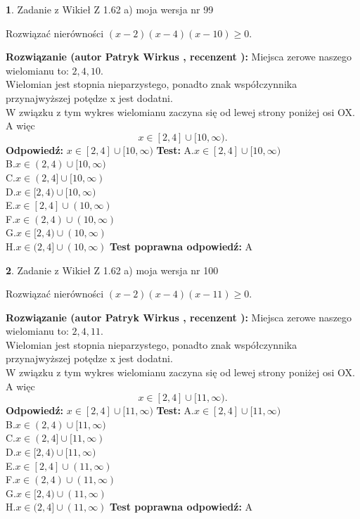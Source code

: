 \documentclass[12pt, a4paper]{article}
\theoremstyle{definition} %
\newtheorem{zad}{}
\newcommand{\zadStart}[1]{\begin{zad}#1\newline}
\newcommand{\zadStop}{\end{zad}}
\newcommand{\rozwStart}[2]{\noindent \textbf{Rozwiązanie (autor #1 , recenzent #2): }\newline}
\newcommand{\rozwStop}{\newline}
\newcommand{\odpStart}{\noindent \textbf{Odpowiedź:}\newline}
\newcommand{\odpStop}{\newline}
\newcommand{\testStart}{\noindent \textbf{Test:}\newline}
\newcommand{\testStop}{\newline}
\newcommand{\kluczStart}{\noindent \textbf{Test poprawna odpowiedź:}\newline}
\newcommand{\kluczStop}{\newline}
\begin{document}
\zadStart{Zadanie z Wikieł Z 1.62 a) moja wersja nr 99}

Rozwiązać nierówności $(x-2)(x-4)(x-10)\ge0$.
\zadStop
\rozwStart{Patryk Wirkus}{}
Miejsca zerowe naszego wielomianu to: $2, 4, 10$.\\
Wielomian jest stopnia nieparzystego, ponadto znak współczynnika przy\linebreak najwyższej potędze x jest dodatni.\\ W związku z tym wykres wielomianu zaczyna się od lewej strony poniżej osi OX. A więc $$x \in [2,4] \cup [10,\infty).$$
\rozwStop
\odpStart
$x \in [2,4] \cup [10,\infty)$
\odpStop
\testStart
A.$x \in [2,4] \cup [10,\infty)$\\
B.$x \in (2,4) \cup [10,\infty)$\\
C.$x \in (2,4] \cup [10,\infty)$\\
D.$x \in [2,4) \cup [10,\infty)$\\
E.$x \in [2,4] \cup (10,\infty)$\\
F.$x \in (2,4) \cup (10,\infty)$\\
G.$x \in [2,4) \cup (10,\infty)$\\
H.$x \in (2,4] \cup (10,\infty)$
\testStop
\kluczStart
A
\kluczStop



\zadStart{Zadanie z Wikieł Z 1.62 a) moja wersja nr 100}

Rozwiązać nierówności $(x-2)(x-4)(x-11)\ge0$.
\zadStop
\rozwStart{Patryk Wirkus}{}
Miejsca zerowe naszego wielomianu to: $2, 4, 11$.\\
Wielomian jest stopnia nieparzystego, ponadto znak współczynnika przy\linebreak najwyższej potędze x jest dodatni.\\ W związku z tym wykres wielomianu zaczyna się od lewej strony poniżej osi OX. A więc $$x \in [2,4] \cup [11,\infty).$$
\rozwStop
\odpStart
$x \in [2,4] \cup [11,\infty)$
\odpStop
\testStart
A.$x \in [2,4] \cup [11,\infty)$\\
B.$x \in (2,4) \cup [11,\infty)$\\
C.$x \in (2,4] \cup [11,\infty)$\\
D.$x \in [2,4) \cup [11,\infty)$\\
E.$x \in [2,4] \cup (11,\infty)$\\
F.$x \in (2,4) \cup (11,\infty)$\\
G.$x \in [2,4) \cup (11,\infty)$\\
H.$x \in (2,4] \cup (11,\infty)$
\testStop
\kluczStart
A
\kluczStop
\end{document}

